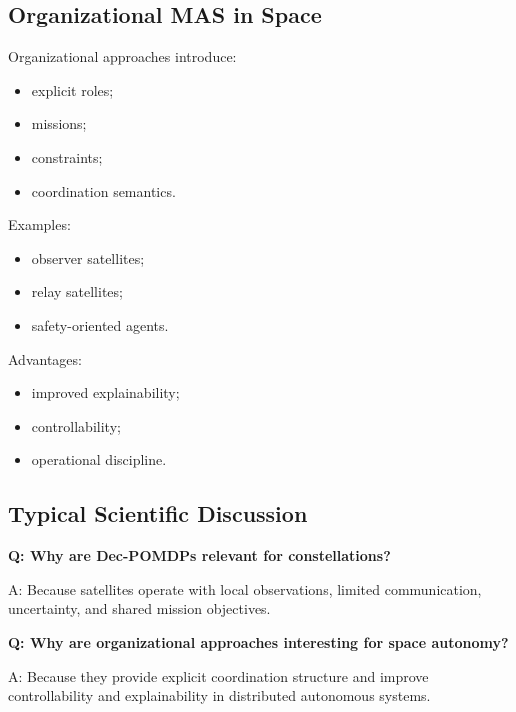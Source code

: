 \documentclass[10pt,a4paper,twocolumn]{article}
\begin{document}

\subsection{Organizational MAS in Space}

Organizational approaches introduce:
\begin{itemize}
    \item explicit roles;
    \item missions;
    \item constraints;
    \item coordination semantics.
\end{itemize}

Examples:
\begin{itemize}
    \item observer satellites;
    \item relay satellites;
    \item safety-oriented agents.
\end{itemize}

Advantages:
\begin{itemize}
    \item improved explainability;
    \item controllability;
    \item operational discipline.
\end{itemize}


\subsection{Typical Scientific Discussion}

\begin{questionbox}
    \textbf{Q: Why are Dec-POMDPs relevant for constellations?}

    A: Because satellites operate with local observations, limited communication, uncertainty, and shared mission objectives.
\end{questionbox}

\begin{questionbox}
    \textbf{Q: Why are organizational approaches interesting for space autonomy?}

    A: Because they provide explicit coordination structure and improve controllability and explainability in distributed autonomous systems.
\end{questionbox}
\end{document}
